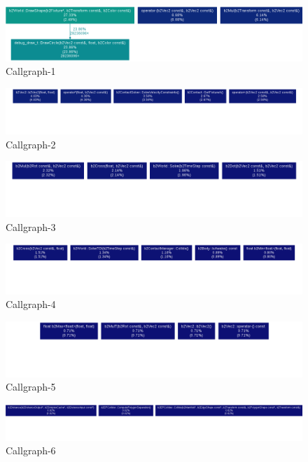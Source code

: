 \documentclass[12pt, a4paper]{article}
\begin{document}
\begin{figure}[H]
\caption{Callgraph-1}
\centering
\includegraphics[width=1.05\textwidth]{1.png}
\end{figure}
\begin{figure}[H]
\caption{Callgraph-2}
\centering
\includegraphics[width=1.05\textwidth]{2.png}
\end{figure}
\begin{figure}[H]
\caption{Callgraph-3}
\centering
\includegraphics[width=1.05\textwidth]{3.png}
\end{figure}
\begin{figure}[H]
\caption{Callgraph-4}
\centering
\includegraphics[width=1.05\textwidth]{4.png}
\end{figure}
\begin{figure}[H]
\caption{Callgraph-5}
\centering
\includegraphics[width=1.05\textwidth]{5.png}
\end{figure}
\begin{figure}[H]
\caption{Callgraph-6}
\centering
\includegraphics[width=1.05\textwidth]{6.png}
\end{figure}
\end{document}
